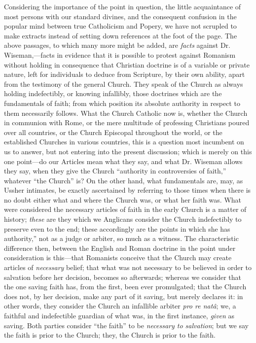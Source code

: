 Considering
the importance of the point in question, the little acquaintance of most
persons with our standard divines, and the consequent confusion in the
popular mind between true Catholicism and Popery, we have not scrupled
to make extracts instead of setting down references at the foot of the
page. The above passages, to which many more might be added, are \emph{facts}
against Dr. Wiseman,—facts in evidence that it is possible to protest
against Romanism without holding in consequence that Christian doctrine
is of a variable or private nature, left for individuals to deduce from
Scripture, by their own ability, apart from the testimony of the general
Church. They speak of the Church as always holding indefectibly, or
knowing infallibly, those doctrines which are the fundamentals of faith;
from which position its absolute authority in respect to them
necessarily follows. What the Church
Catholic now is, whether the Church in communion with Rome, or the mere
multitude of professing Christians poured over all countries, or the
Church Episcopal throughout the world, or the established Churches in
various countries, this is a question most incumbent on us to answer,
but not entering into the present discussion; which is merely on this
one point—do our Articles mean what they say, and what Dr. Wiseman
allows they say, when they give the Church ``authority in controversies
of faith,'' whatever ``the Church'' is? On the other hand, what
fundamentals are, may, as Ussher intimates, be exactly ascertained by
referring to those times when there is no doubt either what and where
the Church was, or what her faith was. What were considered the
necessary articles of faith in the early Church is a matter of history; \emph{these}
are they which we Anglicans consider the Church indefectibly to preserve
even to the end; these accordingly are the points in which she has
authority,'' not as a judge or arbiter, so much as a witness. The
characteristic difference then, between the English and Roman doctrine
in the point under consideration is this—that Romanists conceive that
the Church may create articles of \emph{necessary} belief; that what was
not necessary to be believed in order to salvation before her decision,
becomes so afterwards; whereas we consider that the one saving faith
has, from the first, been ever promulgated; that the Church does not, by
her decision, make any part of it saving, but merely declares it: in
other words, they consider the Church an infallible arbiter \emph{pro re
natâ}; we, a faithful and indefectible guardian of what was, in the
first instance, \emph{given} as saving. Both parties consider ``the
faith'' to be \emph{necessary to salvation}; but we say the faith is
prior to the Church; they, the Church is prior to the faith.

